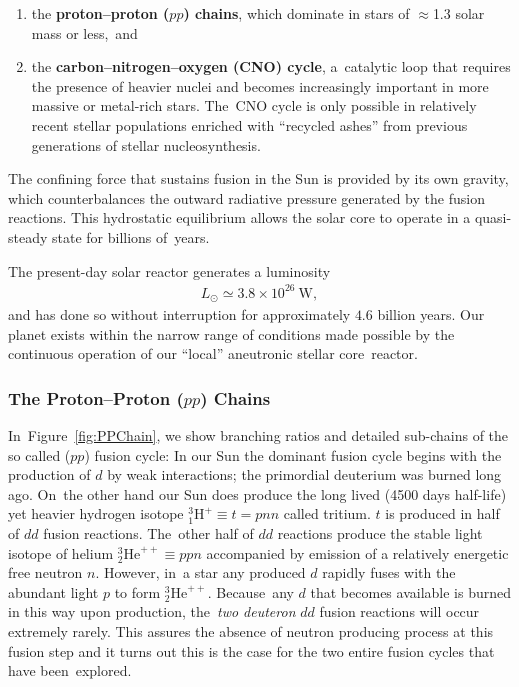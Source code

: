 \documentclass[particles,article,accept,pdftex,moreauthors]{Definitions/mdpi}
\begin{document}
\begin{enumerate}
\item[(1)] the \textbf{proton--proton ($pp$) chains}, which dominate in stars of $\approx$1.3 solar mass or less,~and
\item[(2)] the \textbf{carbon--nitrogen--oxygen (CNO) cycle}, a~catalytic loop that requires the presence of heavier nuclei and becomes increasingly important in more massive or metal-rich stars. The~CNO cycle is only possible in relatively recent stellar populations enriched with ``recycled ashes'' from previous generations of stellar nucleosynthesis.
\end{enumerate}

The confining force that sustains fusion in the Sun is provided by its own gravity, which counterbalances the outward radiative pressure generated by the fusion reactions. This hydrostatic equilibrium allows the solar core to operate in a quasi-steady state for billions of~years.

The present-day solar reactor generates a luminosity
\begin{align}
L_\odot \simeq 3.8\times10^{26}~\mathrm{W},
\end{align}
and has done so without interruption for approximately $4.6$ billion years. Our planet exists within the narrow range of conditions made possible by the continuous operation of our ``local'' aneutronic stellar core~reactor.

\subsubsection{The Proton--Proton (\texorpdfstring{$pp$}{pp}) Chains}\label{sec:PPChains}

In~Figure~\ref{fig:PPChain}, we show branching ratios and detailed sub-chains of the so called ($pp$) fusion cycle: 
In our Sun the dominant fusion cycle begins with the production of $d$ by weak interactions; the primordial deuterium was burned long ago. On~the other hand our Sun does produce the long lived (4500 days half-life) yet heavier hydrogen isotope ${}^{3}_{1}\mathrm{H}^+\equiv t=pnn$ called tritium. $t$ is produced in half of $dd$ fusion reactions. The~other half of $dd$ reactions produce the stable light isotope of helium ${}^{3}_{2}\mathrm{He}^{++}\equiv ppn$ accompanied by emission of a relatively energetic free neutron $n$. However, in~a star any produced $d$ rapidly fuses with the abundant light $p$ to form ${}^{3}_{2}\mathrm{He}^{++}$. Because~any $d$ that becomes available is burned in this way upon production, the~{\em two deuteron} $dd$ fusion reactions will occur extremely rarely. This assures the absence of neutron producing process at this fusion step and it turns out this is the case for the two entire fusion cycles that have been~explored.
\end{document}
